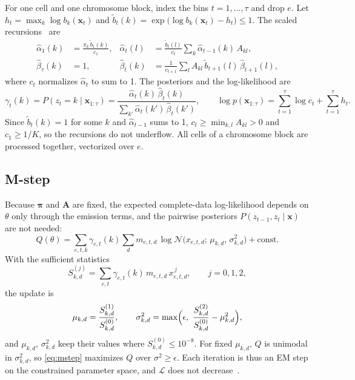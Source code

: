 \documentclass[11pt]{article}
\newcommand{\Norm}{\mathcal{N}}
\newcommand{\x}{\mathbf{x}}
\begin{document}
For one cell and one chromosome block, index the bins $t = 1, \dots, \tau$ and drop $e$. Let
$h_t = \max_k \log b_k(\x_t)$ and $\tilde b_t(k) = \exp\bigl(\log b_k(\x_t) - h_t\bigr) \le 1$.
The scaled recursions~\cite{rabiner1989,mackay2003} are
\begin{align}
\hat\alpha_1(k) &= \frac{\pi_k\, \tilde b_1(k)}{c_1}, &
\hat\alpha_t(l) &= \frac{\tilde b_t(l)}{c_t} \sum_{k} \hat\alpha_{t-1}(k)\, A_{kl}, \label{eq:forward}\\
\hat\beta_\tau(k) &= 1, &
\hat\beta_t(k) &= \frac{1}{c_{t+1}} \sum_{l} A_{kl}\, \tilde b_{t+1}(l)\, \hat\beta_{t+1}(l), \label{eq:backward}
\end{align}
where $c_t$ normalizes $\hat\alpha_t$ to sum to 1. The posteriors and the log-likelihood are
\begin{equation}
\gamma_t(k) = P(z_t = k \mid \x_{1:\tau})
= \frac{\hat\alpha_t(k)\,\hat\beta_t(k)}{\sum_{k'} \hat\alpha_t(k')\,\hat\beta_t(k')},
\qquad
\log p(\x_{1:\tau}) = \sum_{t=1}^{\tau} \log c_t + \sum_{t=1}^{\tau} h_t .
\label{eq:posterior}
\end{equation}
Since $\tilde b_t(k) = 1$ for some $k$ and $\hat\alpha_{t-1}$ sums to 1,
$c_t \ge \min_{k,l} A_{kl} > 0$ and $c_1 \ge 1/K$, so the recursions do not underflow. All cells
of a chromosome block are processed together, vectorized over $e$.

\subsection{M-step}\label{sec:mstep}

Because $\bm\pi$ and $\mathbf{A}$ are fixed, the expected complete-data log-likelihood depends
on $\theta$ only through the emission terms, and the pairwise posteriors
$P(z_{t-1}, z_t \mid \x)$ are not needed:
\begin{equation}
Q(\theta) = \sum_{e,t,k} \gamma_{e,t}(k) \sum_{d} m_{e,t,d}\,
\log \Norm\bigl(x_{e,t,d};\, \mu_{k,d},\, \sigma^2_{k,d}\bigr) + \text{const}.
\end{equation}
With the sufficient statistics
\begin{equation}
S^{(j)}_{k,d} = \sum_{e,t} \gamma_{e,t}(k)\, m_{e,t,d}\, x_{e,t,d}^{\,j}, \qquad j = 0, 1, 2,
\end{equation}
the update is
\begin{equation}
\mu_{k,d} = \frac{S^{(1)}_{k,d}}{S^{(0)}_{k,d}}, \qquad
\sigma^2_{k,d} = \max\Bigl(\epsilon,\ \frac{S^{(2)}_{k,d}}{S^{(0)}_{k,d}} - \mu_{k,d}^2\Bigr),
\label{eq:mstep}
\end{equation}
and $\mu_{k,d}$, $\sigma^2_{k,d}$ keep their values where $S^{(0)}_{k,d} \le 10^{-8}$. For fixed
$\mu_{k,d}$, $Q$ is unimodal in $\sigma^2_{k,d}$, so \eqref{eq:mstep} maximizes $Q$ over
$\sigma^2 \ge \epsilon$. Each iteration is thus an EM step on the constrained parameter space,
and $\mathcal{L}$ does not decrease~\cite{dempster1977}.
\end{document}
